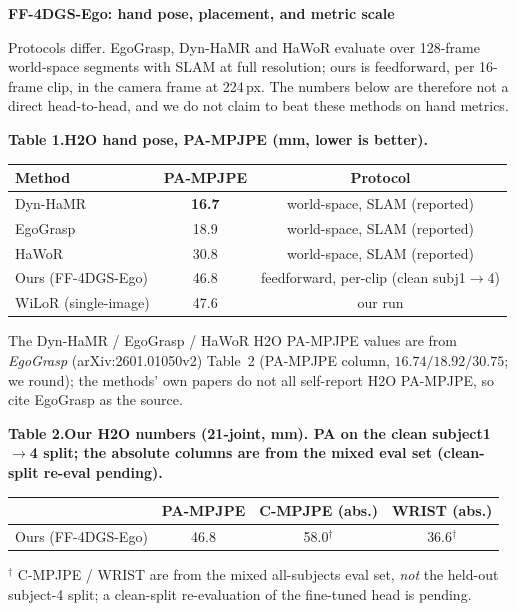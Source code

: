 \documentclass[10pt]{article}
\begin{document}
\pagestyle{empty}

\begin{center}
{\large\textbf{FF-4DGS-Ego: hand pose, placement, and metric scale}}
\end{center}

\vspace{0.2em}
{\small\noindent Protocols differ. EgoGrasp, Dyn-HaMR and HaWoR evaluate over 128-frame world-space
segments with SLAM at full resolution; ours is feedforward, per 16-frame clip, in the camera frame at
224\,px. The numbers below are therefore not a direct head-to-head, and we do not claim to beat these
methods on hand metrics.}

\vspace{0.5em}
\noindent\textbf{Table 1.\quad H2O hand pose, PA-MPJPE (mm, lower is better).}
\begin{center}\begin{tabular}{lcc}
\toprule
Method & PA-MPJPE & Protocol \\
\midrule
Dyn-HaMR & \textbf{16.7} & world-space, SLAM (reported) \\
EgoGrasp & 18.9 & world-space, SLAM (reported) \\
HaWoR & 30.8 & world-space, SLAM (reported) \\
Ours (FF-4DGS-Ego) & 46.8 & feedforward, per-clip (clean subj1$\to$4) \\
WiLoR (single-image) & 47.6 & our run \\
\bottomrule
\end{tabular}\end{center}
{\small\noindent The Dyn-HaMR / EgoGrasp / HaWoR H2O PA-MPJPE values are from \emph{EgoGrasp}
(arXiv:2601.01050v2) Table~2 (PA-MPJPE column, $16.74 / 18.92 / 30.75$; we round); the methods' own
papers do not all self-report H2O PA-MPJPE, so cite EgoGrasp as the source.}

\vspace{0.3em}
\noindent\textbf{Table 2.\quad Our H2O numbers (21-joint, mm). PA on the clean subject1$\to$4 split;
the absolute columns are from the mixed eval set (clean-split re-eval pending).}
\begin{center}\begin{tabular}{lccc}
\toprule
 & PA-MPJPE & C-MPJPE (abs.) & WRIST (abs.) \\
\midrule
Ours (FF-4DGS-Ego) & 46.8 & 58.0$^\dagger$ & 36.6$^\dagger$ \\
\bottomrule
\end{tabular}\end{center}
{\small\noindent $^\dagger$ C-MPJPE / WRIST are from the mixed all-subjects eval set, \emph{not} the
held-out subject-4 split; a clean-split re-evaluation of the fine-tuned head is pending.}
\end{document}
